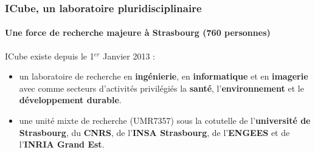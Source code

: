 \begin{frame}
    \frametitle{ICube, un laboratoire pluridisciplinaire}
    \framesubtitle{Une force de recherche majeure à Strasbourg (760 personnes)}

    \begin{block}
        ICube existe depuis le 1$^{er}$ Janvier 2013 :
        \begin{itemize}
            \item un laboratoire de recherche en \textbf{ingénierie}, en \textbf{informatique} et en \textbf{imagerie} avec comme secteurs d'activités privilégiés la \textbf{santé}, l'\textbf{environnement} et le \textbf{développement durable}.
            \item une unité mixte de recherche (UMR7357) sous la cotutelle de l’\textbf{université de Strasbourg}, du \textbf{CNRS}, de l’\textbf{INSA Strasbourg}, de l’\textbf{ENGEES} et de l’\textbf{INRIA Grand Est}.
        \end{itemize}
    \end{block}
 

\end{frame}
